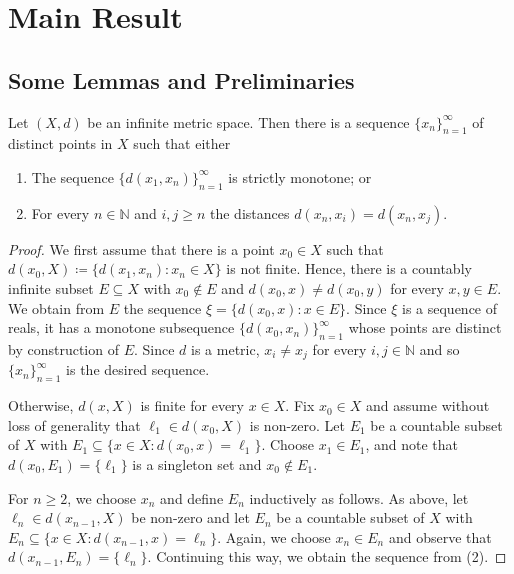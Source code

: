 \section{Main Result}
\subsection{Some Lemmas and Preliminaries}
\begin{lemma}
Let \( (X, d) \) be an infinite metric space. Then there is a sequence \( \{ x_{n}  \}_{n = 1} ^{\infty}  \) of distinct points in \( X \) such that either
\begin{enumerate}[leftmargin = 1.2cm]
	\item The sequence \( \{ d(x_1, x_{n} ) \}_{n = 1} ^{\infty}  \) is strictly monotone; or
	\item For every \( n \in \mathbb{N}  \) and \( i,j \geq n \) the distances \( d(x_{n} , x_{i} ) = d(x_{n} , x_{j} ) \).
	
\end{enumerate}
\end{lemma}
\begin{proof}
We first assume that there is a point \( x_0 \in X \) such that \( d(x_0, X) \coloneqq \{ d(x_1, x_{n} ) : x_{n} \in X \}  \) is not finite. Hence, there is a countably infinite subset \( E \subseteq X \) with \( x_0 \notin E \) and \( d(x_0, x) \neq d(x_0, y) \) for every \( x,y \in E \). We obtain from \( E \) the sequence \( \xi = \{ d(x_0, x) : x \in E \}  \). Since \( \xi \) is a sequence of reals, it has a monotone subsequence \( \{ d(x_0, x_{n} ) \}_{n=1} ^{\infty} \) whose points are distinct by construction of \( E \). Since \( d \) is a metric, \( x_{i} \neq x_{j}  \) for every \( i,j \in \mathbb{N}  \) and so \( \{ x_{n}  \}_{n = 1} ^{\infty}  \) is the desired sequence.

Otherwise, \( d(x, X) \) is finite for every \( x \in X \). Fix \( x_0 \in X \) and assume without loss of generality that \( \ell_1 \in d(x_0, X)\) is non-zero. Let \( E_1 \) be a countable subset of \( X \) with \(E_1 \subseteq  \{ x \in X : d(x_0, x) = \ell_1 \}. \) Choose \( x_1 \in E_1 \), and note that \( d(x_0, E_1) = \{ \ell_1 \} \) is a singleton set and \( x_0 \notin E_1 \). 

For \( n \geq 2 \), we choose \( x_{n}  \) and define \( E_{n}  \) inductively as follows. As above, let \( \ell_{n} \in d(x_{n-1} , X) \) be non-zero and let \( E_{n}  \) be a countable subset of \( X \) with \( E_{n} \subseteq \{ x \in X : d(x_{n-1} , x) = \ell_{n} \} . \) Again, we choose \( x_{n} \in E_{n}  \) and observe that \( d(x_{n-1} , E_{n} ) = \{ \ell_{n}  \}  \). Continuing this way, we obtain the sequence from (2).
\end{proof}

